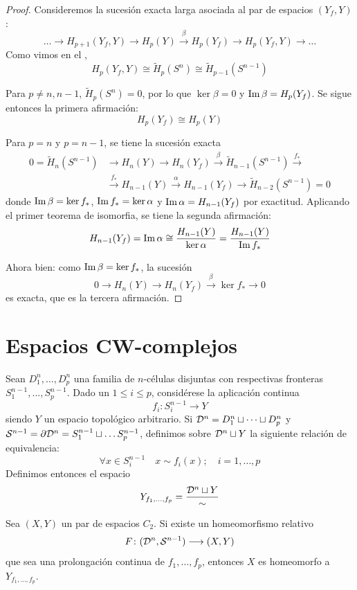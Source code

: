 \begin{proof}
Consideremos la sucesión exacta larga asociada al par de espacios $(Y_f,Y)$:
\[\dots \longrightarrow H_{p+1}(Y_f,Y) \longrightarrow H_p(Y)
\xrightarrow{\beta} H_p(Y_f) \longrightarrow H_p(Y_f,Y) \longrightarrow \dots\]
Como vimos en el ,
\[H_p(Y_f,Y)\cong \tilde{H}_p(S^n) \cong \tilde{H}_{p-1}(S^{n-1})\]

Para $p\neq n,n-1$, $\tilde{H}_p(S^n)=0$, por lo que $\ker
\beta=0$ y $\operatorname{Im} \beta=H_p(Y_f)$. Se sigue entonces la primera afirmación:
\[H_p(Y_f) \cong H_p(Y)\]

Para $p=n$ y $p=n-1$, se tiene la sucesión exacta
\begin{align*}
0=\tilde{H}_n(S^{n-1}) &\longrightarrow H_n(Y) \longrightarrow H_n(Y_f)
\xrightarrow{\beta} \tilde{H}_{n-1}(S^{n-1}) \xrightarrow{f_*} \\
&\xrightarrow{f_*} H_{n-1}(Y) \xrightarrow{\alpha} H_{n-1}(Y_f)
\longrightarrow \tilde{H}_{n-2}(S^{n-1})=0
\end{align*}
donde $\operatorname{Im} \beta=\ker f_*$, $\operatorname{Im} f_*=\ker \alpha$ y $\operatorname{Im} \alpha=H_{n-1}(Y_f)$
por exactitud. Aplicando el primer teorema de isomorfia, se tiene la segunda
afirmación:
\[H_{n-1}(Y_f)=\operatorname{Im} \alpha \cong \frac{H_{n-1}(Y)}{\ker \alpha}=
\frac{H_{n-1}(Y)}{\operatorname{Im} f_*}\]

Ahora bien: como $\operatorname{Im} \beta=\ker f_*$, la sucesión
\[0 \longrightarrow H_n(Y) \longrightarrow H_n(Y_f) \xrightarrow{\beta}
\ker f_* \longrightarrow 0\] es exacta, que es la tercera afirmación.
\end{proof}

\section{Espacios CW-complejos}
Sean $D_1^n,\dots, D_p^n$ una familia de $n$-células disjuntas con respectivas
fronteras $S^{n-1}_1,\dots,S^{n-1}_p$. Dado un $1 \leq i \leq p$, considérese
la aplicación continua
\[f_i\colon S^{n-1}_i \longrightarrow Y\]
siendo $Y$ un espacio topológico arbitrario. Si $\mathcal{D}^n=D^n_1\sqcup\dots
\sqcup D^n_p$ y $\mathcal{S}^{n-1}=\partial \mathcal{D}^n=S^{n-1}_1\sqcup \dots S^{n-1}_p$,
definimos sobre $\mathcal{D}^n\sqcup Y$ la siguiente relación de equivalencia:
\[\forall x \in S^{n-1}_i \quad x \sim f_i(x); \quad i=1,\dots,p\]
Definimos entonces el espacio
\[Y_{f_1,\dots,f_p}=\frac{\mathcal{D}^n\sqcup Y}{\sim}\]

\begin{proposition}
Sea $(X,Y)$ un par de espacios $C_2$. Si existe un homeomorfismo relativo
\[F\colon (\mathcal{D}^n,\mathcal{S}^{n-1})\longrightarrow(X,Y)\]
que sea una prolongación continua de $f_1,\dots,f_p$, entonces $X$ es
homeomorfo a $Y_{f_1,\dots,f_p}$.
\end{proposition}

